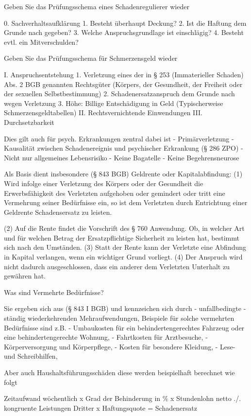 
Geben Sie das Prüfungsschema eines Schadenregulierer wieder

0. Sachverhaltsaufklärung
1. Besteht überhaupt Deckung?
2. Ist die Haftung dem Grunde nach gegeben?
3. Welche Anspruchsgrundlage ist einschlägig?
4. Besteht evtl. ein Mitverschulden?


Geben Sie das Prüfungsschema für Schmerzensgeld wieder 


I. Anspruchsentstehung
1. Verletzung eines der in § 253 (Immaterieller Schaden) Abs. 2 BGB genannten Rechtsgüter 
(Körpers, der Gesundheit, der Freiheit oder der sexuellen Selbstbestimmung)
2. Schadenersatzanspruch dem Grunde nach wegen Verletzung
3. Höhe: Billige Entschädigung in Geld (Typischerweise Schmerzensgeldtabellen)
II.
Rechtsvernichtende Einwendungen
III.
Durchsetzbarkeit

Dies gilt auch für psych. Erkrankungen zentral dabei ist
- Primärverletzung
- Kausalität zwischen Schadenereignis und psychischer Erkrankung (§ 286 ZPO)
- Nicht nur allgemeines Lebensrisiko
- Keine Bagatelle
- Keine Begehrensneurose

Als Basis dient insbesondere (§ 843 BGB) Geldrente oder Kapitalabfindung:
(1) Wird infolge einer Verletzung des Körpers oder der Gesundheit die Erwerbsfähigkeit des Verletzten aufgehoben oder gemindert 
  oder tritt eine Vermehrung seiner Bedürfnisse ein, so ist dem Verletzten durch Entrichtung einer Geldrente Schadensersatz zu leisten.

(2) Auf die Rente findet die Vorschrift des § 760 Anwendung. Ob, 
  in welcher Art und für welchen Betrag der Ersatzpflichtige Sicherheit zu leisten hat, bestimmt sich nach den Umständen.
(3) Statt der Rente kann der Verletzte eine Abfindung in Kapital verlangen, wenn ein wichtiger Grund vorliegt.
(4) Der Anspruch wird nicht dadurch ausgeschlossen, dass ein anderer dem Verletzten Unterhalt zu gewähren hat.


Was sind Vermehrte Bedürfnisse?

Sie ergeben sich aus (§ 843 I BGB) und kennzeichen sich durch 
- unfallbedingte
- ständig wiederkehrenden Mehraufwendungen,
Beispiele für solche vermehrten Bedürfnisse sind z.B. 
- Umbaukosten für ein behindertengerechtes Fahrzeug oder eine behindertengerechte Wohnung, 
- Fahrtkosten für Arztbesuche, 
- Körperversorgung und Körperpflege, 
- Kosten für besondere Kleidung, 
- Lese- und Schreibhilfen,

Aber auch Haushaltsführungsschäden
diese werden beispielhaft berechnet wie folgt

Zeitaufwand wöchentlich x Grad der Behinderung in \% x Stundenlohn netto ./. kongruente
Leistungen Dritter x Haftungsquote = Schadenersatz

